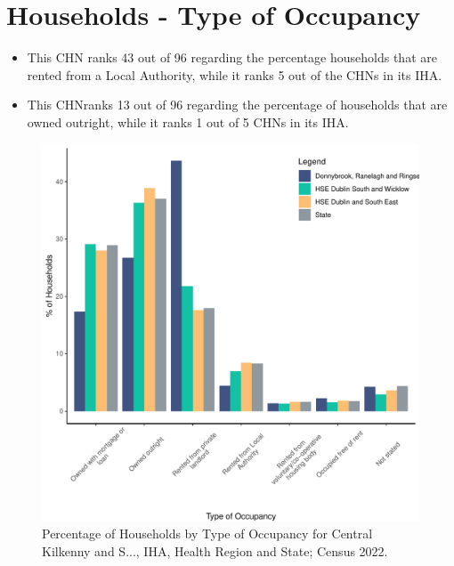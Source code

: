 \documentclass{article}
\begin{document}
\section{Households - Type of Occupancy}\label{sect:Households}
\begin{itemize}
\item This CHN ranks  43 out of 96 regarding the percentage households that are rented from a Local Authority, while it ranks  5 out of the CHNs in its IHA. 
\item This CHNranks  13 out of 96 regarding the percentage of households that are owned outright, while it ranks   1 out of 5 CHNs in its IHA.
\end{itemize}
\begin{figure}[H]
	\centering
	\includegraphics[width = 140mm]{../figures/HouseholdsED.pdf}
	\caption{Percentage of Households by Type of Occupancy for Central Kilkenny and S..., IHA, Health Region and State; Census 2022.}
	\label{fig:vbnv}
	\end{figure}
\end{document}
